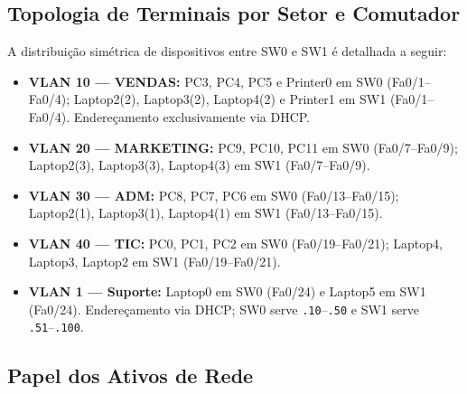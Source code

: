 \documentclass[12pt,a4paper]{article}
\begin{document}
\subsection{Topologia de Terminais por Setor e Comutador}

A distribuição simétrica de dispositivos entre SW0 e SW1 é detalhada a seguir:

\begin{itemize}[leftmargin=2em]
  \item \textbf{VLAN 10 --- VENDAS:} PC3, PC4, PC5 e Printer0 em SW0
        (Fa0/1--Fa0/4); Laptop2(2), Laptop3(2), Laptop4(2) e Printer1 em SW1
        (Fa0/1--Fa0/4). Endereçamento exclusivamente via DHCP.

  \item \textbf{VLAN 20 --- MARKETING:} PC9, PC10, PC11 em SW0 (Fa0/7--Fa0/9);
        Laptop2(3), Laptop3(3), Laptop4(3) em SW1 (Fa0/7--Fa0/9).

  \item \textbf{VLAN 30 --- ADM:} PC8, PC7, PC6 em SW0 (Fa0/13--Fa0/15);
        Laptop2(1), Laptop3(1), Laptop4(1) em SW1 (Fa0/13--Fa0/15).

  \item \textbf{VLAN 40 --- TIC:} PC0, PC1, PC2 em SW0 (Fa0/19--Fa0/21);
        Laptop4, Laptop3, Laptop2 em SW1 (Fa0/19--Fa0/21).

  \item \textbf{VLAN 1 --- Suporte:} Laptop0 em SW0 (Fa0/24) e Laptop5 em SW1
        (Fa0/24). Endereçamento via DHCP; SW0 serve \texttt{.10}--\texttt{.50} e
        SW1 serve \texttt{.51}--\texttt{.100}.
\end{itemize}

\subsection{Papel dos Ativos de Rede}
\end{document}
